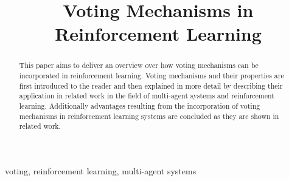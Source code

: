 \documentclass[conference]{IEEEtran}
\begin{document}
\title{Voting Mechanisms in Reinforcement Learning}

\author{
}

\maketitle


\begin{abstract}
This paper aims to deliver an overview over how voting mechanisms can be incorporated in reinforcement learning.
Voting mechanisms and their properties are first introduced to the reader and then explained in more detail by describing their application in related work in the field of multi-agent systems and reinforcement learning.
Additionally advantages resulting from the incorporation of voting mechanisms in reinforcement learning systems are concluded as they are shown in related work.
\end{abstract}

\begin{IEEEkeywords}
voting, reinforcement learning, multi-agent systems
\end{IEEEkeywords}

\end{document}
